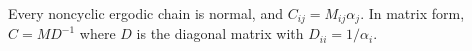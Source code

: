 Every noncyclic ergodic chain is normal, and $C_{ij} = M_{ij}\alpha_j$. In matrix form, $C = M D^{-1}$ where $D$ is the diagonal matrix with $D_{ii} = 1/\alpha_i$.